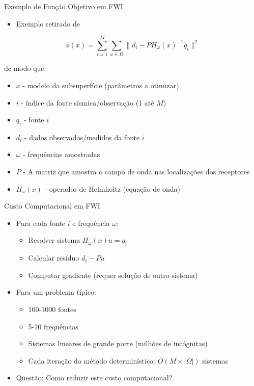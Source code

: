 \documentclass[aspectratio=1610]{beamer}
\begin{document}
\begin{frame}{Exemplo de Função Objetivo em FWI}
\begin{itemize}
    \item Exemplo retirado de \cite{friedlander2012}
\end{itemize}
\begin{equation*}
\phi(x) = \sum_{i=1}^{M} \sum_{\omega \in \Omega} \|d_i - P H_\omega(x)^{-1}q_i\|^2
\end{equation*}

de modo que: \pause
\begin{itemize}
    \item $x$ - modelo da subsuperfície (parâmetros a otimizar) \pause
    \item $i$ - índice da fonte sísmica/observação (1 até $M$) \pause
    \item $q_i$ - fonte $i$ \pause
    \item $d_i$ - dados observados/medidos da fonte $i$ \pause
    \item $\omega$ - frequências amostradas \pause
    \item $P$ - A matriz que amostra o campo de onda nas localizações dos receptores \pause
    \item $H_\omega(x)$ - operador de Helmholtz (equação de onda)
\end{itemize}
\end{frame}

\begin{frame}{Custo Computacional em FWI}
\begin{itemize}
    \item Para cada fonte $i$ e frequência $\omega$: \pause
    \begin{itemize}
        \item Resolver sistema $H_\omega(x)u = q_i$ \pause
        \item Calcular resíduo $d_i - Pu$ \pause
        \item Computar gradiente (requer solução de outro sistema)
    \end{itemize} \pause
    \item Para um problema típico:
    \begin{itemize}
        \item 100-1000 fontes \pause
        \item 5-10 frequências \pause
        \item Sistemas lineares de grande porte (milhões de incógnitas) \pause
        \item Cada iteração do método determinístico: $O(M \times |\Omega|)$ sistemas
    \end{itemize} \pause
    \item Questão: \alert{Como reduzir este custo computacional?}
\end{itemize}
\end{frame}
\end{document}
